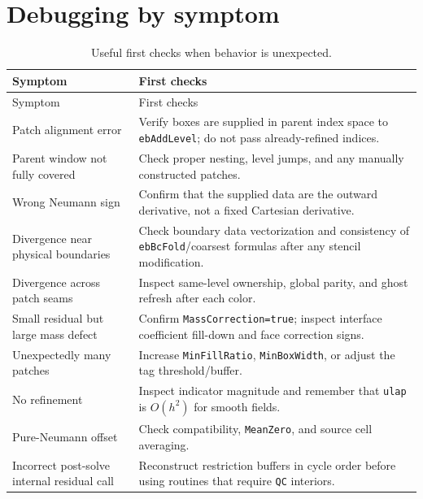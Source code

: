 \documentclass[11pt,oneside,openany]{book}
\newcommand{\code}[1]{\textnormal{\texttt{#1}}}
\begin{document}
\section{Debugging by symptom}
\begin{longtable}{@{}p{}p{}@{}}
\caption{Useful first checks when behavior is unexpected.}\label{tab:debug}\\
\toprule
Symptom & First checks \\
\midrule
\endfirsthead
\toprule
Symptom & First checks \\
\midrule
\endhead
Patch alignment error & Verify boxes are supplied in parent index space to \code{ebAddLevel}; do not pass already-refined indices. \\
Parent window not fully covered & Check proper nesting, level jumps, and any manually constructed patches. \\
Wrong Neumann sign & Confirm that the supplied data are the outward derivative, not a fixed Cartesian derivative. \\
Divergence near physical boundaries & Check boundary data vectorization and consistency of \code{ebBcFold}/coarsest formulas after any stencil modification. \\
Divergence across patch seams & Inspect same-level ownership, global parity, and ghost refresh after each color. \\
Small residual but large mass defect & Confirm \code{MassCorrection=true}; inspect interface coefficient fill-down and face correction signs. \\
Unexpectedly many patches & Increase \code{MinFillRatio}, \code{MinBoxWidth}, or adjust the tag threshold/buffer. \\
No refinement & Inspect indicator magnitude and remember that \code{ulap} is $O(h^2)$ for smooth fields. \\
Pure-Neumann offset & Check compatibility, \code{MeanZero}, and source cell averaging. \\
Incorrect post-solve internal residual call & Reconstruct restriction buffers in cycle order before using routines that require \code{QC} interiors. \\
\bottomrule
\end{longtable}
\end{document}
